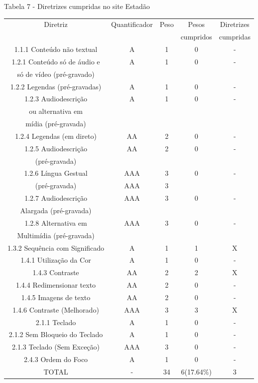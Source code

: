 \documentclass[a4paper]{article}
\begin{document}
\begin{titlepage}
Tabela 7 - Diretrizes cumpridas no site Estadão\\[-1cm]
\begin{center}
	\fontsize{8pt}{8pt}\selectfont	
	\begin{longtable}{|c|c|c|c|c|}
		\hline
		Diretriz & Quantificador & Peso & Pesos & Diretrizes\\
		& & & cumpridos & cumpridas\\
		\hline
		1.1.1 Conteúdo não textual & A & 1 & 0 & - \\
		\hline
		1.2.1 Conteúdo só de áudio e & A & 1 & 0 & - \\
		só de vídeo (pré-gravado) & & & & \\
		\hline
		1.2.2 Legendas (pré-gravadas) & A & 1 & 0 & - \\
		\hline
		1.2.3 Audiodescrição & A & 1 & 0 & - \\
		ou alternativa em & & & & \\
		mídia (pré-gravada) & & & & \\
		\hline
		1.2.4 Legendas (em direto) & AA & 2 & 0 & - \\
		\hline
		1.2.5 Audiodescrição & AA & 2 & 0 & - \\
		(pré-gravada) & & & & \\
		\hline
		1.2.6 Língua Gestual & AAA & 3 & 0 & - \\
		(pré-gravada) & AAA & 3 & & \\
		\hline
		1.2.7 Audiodescrição & AAA & 3 & 0 & - \\
		Alargada (pré-gravada) & & & & \\
		\hline
		1.2.8 Alternativa em & AAA & 3 & 0 & - \\
		Multimídia (pré-gravada) & & & & \\
		\hline
		1.3.2 Sequência com Significado & A & 1 & 1 & X \\
		\hline
		1.4.1 Utilização da Cor & A & 1 & 0 & - \\
		\hline
		1.4.3 Contraste & AA & 2 & 2 & X \\
		\hline
		1.4.4 Redimensionar texto & AA & 2 & 0 & - \\
		\hline
		1.4.5 Imagens de texto & AA & 2 & 0 & - \\
		\hline
		1.4.6 Contraste (Melhorado) & AAA & 3 & 3 & X \\
		\hline
		2.1.1 Teclado & A & 1 & 0 & - \\
		\hline
		2.1.2 Sem Bloqueio do Teclado & A & 1 & 0 & - \\
		\hline
		2.1.3 Teclado (Sem Exceção) & AAA & 3 & 0 & - \\
		\hline
		2.4.3 Ordem do Foco & A & 1 & 0 & - \\
		\hline
		TOTAL & - & 34 & 6(17.64\%) & 3 \\
		\hline
	\end{longtable}
\end{center}


\end{titlepage}
\end{document}
